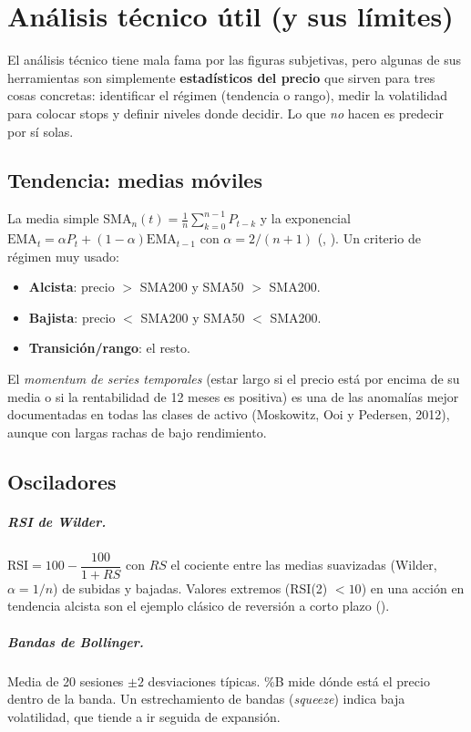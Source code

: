 \chapter{Análisis técnico útil (y sus límites)}\label{cap:tecnico}

El análisis técnico tiene mala fama por las figuras subjetivas, pero algunas de sus herramientas son
simplemente \textbf{estadísticos del precio} que sirven para tres cosas concretas: identificar el
régimen (tendencia o rango), medir la volatilidad para colocar stops y definir niveles donde decidir.
Lo que \emph{no} hacen es predecir por sí solas.

\section{Tendencia: medias móviles}
La media simple $\text{SMA}_n(t) = \frac1n\sum_{k=0}^{n-1} P_{t-k}$ y la exponencial
$\text{EMA}_t = \alpha P_t + (1-\alpha)\text{EMA}_{t-1}$ con $\alpha = 2/(n+1)$
(, ). Un criterio de régimen muy usado:
\begin{itemize}
\item \textbf{Alcista}: precio $>$ SMA200 y SMA50 $>$ SMA200.
\item \textbf{Bajista}: precio $<$ SMA200 y SMA50 $<$ SMA200.
\item \textbf{Transición/rango}: el resto.
\end{itemize}
El \emph{momentum de series temporales} (estar largo si el precio está por encima de su media o si la
rentabilidad de 12 meses es positiva) es una de las anomalías mejor documentadas en todas las clases de
activo (Moskowitz, Ooi y Pedersen, 2012), aunque con largas rachas de bajo rendimiento.

\section{Osciladores}
\paragraph{RSI de Wilder.} $\text{RSI} = 100 - \dfrac{100}{1+RS}$ con $RS$ el cociente entre las
medias suavizadas (Wilder, $\alpha=1/n$) de subidas y bajadas. Valores extremos (RSI(2) $<10$) en una
acción en tendencia alcista son el ejemplo clásico de reversión a corto plazo
().

\paragraph{Bandas de Bollinger.} Media de 20 sesiones $\pm 2$ desviaciones típicas. \%B mide dónde
está el precio dentro de la banda. Un estrechamiento de bandas (\emph{squeeze}) indica baja
volatilidad, que tiende a ir seguida de expansión.

